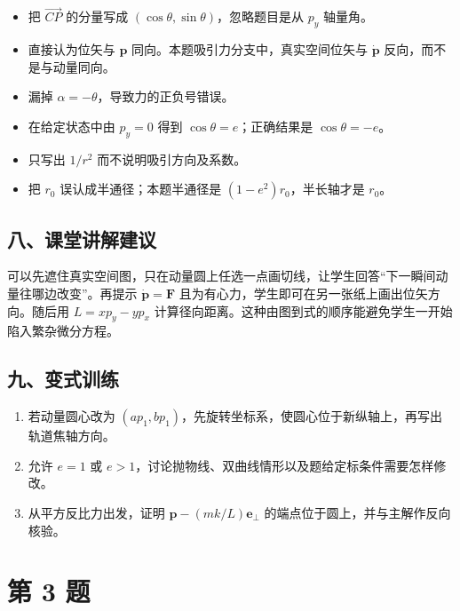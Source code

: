 \documentclass[12pt,a4paper,UTF8]{ctexart}
\newcommand{\tightlist}{\setlength{\itemsep}{0pt}\setlength{\parskip}{0pt}}
\begin{document}
\begin{itemize}
\tightlist
\item
  把 \(\overrightarrow{CP}\) 的分量写成
  \((\cos\theta,\sin\theta)\)，忽略题目是从 \(p_y\) 轴量角。
\item
  直接认为位矢与 \(\bm p\) 同向。本题吸引力分支中，真实空间位矢与
  \(\dot{\bm p}\) 反向，而不是与动量同向。
\item
  漏掉 \(\alpha=-\theta\)，导致力的正负号错误。
\item
  在给定状态中由 \(p_y=0\) 得到 \(\cos\theta=e\)；正确结果是
  \(\cos\theta=-e\)。
\item
  只写出 \(1/r^2\) 而不说明吸引方向及系数。
\item
  把 \(r_0\) 误认成半通径；本题半通径是 \((1-e^2)r_0\)，半长轴才是
  \(r_0\)。
\end{itemize}

\subsection{八、课堂讲解建议}\label{ux516bux8bfeux5802ux8bb2ux89e3ux5efaux8bae-1}

可以先遮住真实空间图，只在动量圆上任选一点画切线，让学生回答``下一瞬间动量往哪边改变''。再提示
\(\dot{\bm p}=\bm F\)
且为有心力，学生即可在另一张纸上画出位矢方向。随后用 \(L=xp_y-yp_x\)
计算径向距离。这种由图到式的顺序能避免学生一开始陷入繁杂微分方程。

\subsection{九、变式训练}\label{ux4e5dux53d8ux5f0fux8badux7ec3-1}

\begin{enumerate}
\def\labelenumi{\arabic{enumi}.}
\tightlist
\item
  若动量圆心改为
  \((ap_1,bp_1)\)，先旋转坐标系，使圆心位于新纵轴上，再写出轨道焦轴方向。
\item
  允许 \(e=1\) 或
  \(e>1\)，讨论抛物线、双曲线情形以及题给定标条件需要怎样修改。
\item
  从平方反比力出发，证明 \(\bm p-(mk/L)\bm e_\perp\)
  的端点位于圆上，并与主解作反向核验。
\end{enumerate}

\newpage

\section{第 3 题}\label{ux7b2c-3-ux9898}
\end{document}
